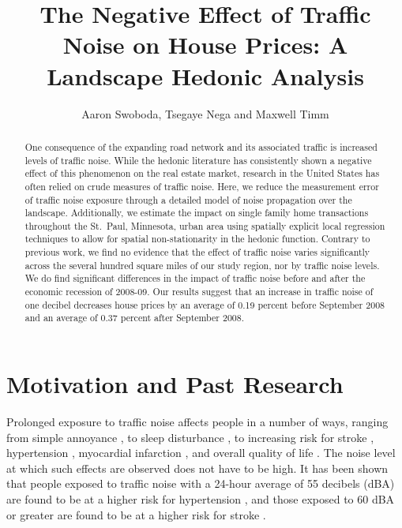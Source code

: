 \documentclass{article}\usepackage[]{graphicx}\usepackage[]{color}
\title{The Negative Effect of Traffic Noise on House Prices: A Landscape Hedonic Analysis}
\date{}
\author{Aaron Swoboda, Tsegaye Nega and Maxwell Timm}
\begin{document}
\maketitle
{}
\begin{singlespace}
\begin{abstract}
One consequence of the expanding road network and its associated traffic is increased levels of traffic noise.  While the hedonic literature has consistently shown a negative effect of this phenomenon on the real estate market, research in the United States has often relied on crude measures of traffic noise. Here, we reduce the measurement error of traffic noise exposure through a detailed model of noise propagation over the landscape. Additionally, we estimate the impact on single family home transactions throughout the St.\ Paul, Minnesota, urban area using spatially explicit local regression techniques to allow for spatial non-stationarity in the hedonic function. Contrary to previous work, we find no evidence that the effect of traffic noise varies significantly across the several hundred square miles of our study region, nor by traffic noise levels. We do find significant differences in the impact of traffic noise before and after the economic recession of 2008-09. Our results suggest that an increase in traffic noise of one decibel decreases house prices by an average of 0.19 percent before September 2008 and an average of 0.37 percent after September 2008.
\end{abstract}
\end{singlespace}

\clearpage
{} 

\section{Motivation and Past Research}\label{sec:lit}
Prolonged exposure to traffic noise affects people in a number of ways, ranging from simple annoyance \citep{Miedema2001, Ouis2001, Ohrstrom2007, DeKluizenaar2013, Weinhold2013}, to sleep disturbance , to increasing risk for stroke \citep{Sorensen2011}, hypertension \citep{Jarup2008, Bodin2009}, myocardial infarction \citep{Babisch2005}, and overall quality of life \citep{Shepherd2013}. The noise level at which such effects are observed does not have to be high.  It has been shown that people exposed to traffic noise with a 24-hour average of 55 decibels (dBA) are found to be at a higher risk for hypertension \citep{Barregard2009, Bodin2009}, and those exposed to 60 dBA or greater are found to be at a higher risk for stroke \citep{Sorensen2011}.  
\end{document}
